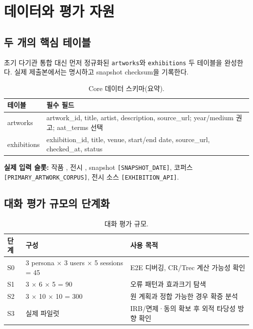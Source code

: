 \documentclass[10pt,a4paper,twocolumn]{article}
\newcommand{\CorpusName}{\texttt{[PRIMARY\_ARTWORK\_CORPUS]}}
\newcommand{\ExhibitionSource}{\texttt{[EXHIBITION\_API]}}
\newcommand{\ArtworkN}{\texttt{[N\_ARTWORKS]}}
\newcommand{\ExhibitionN}{\texttt{[N\_EXHIBITIONS]}}
\newcommand{\SnapshotDate}{\texttt{[SNAPSHOT\_DATE]}}
\begin{document}
\section{데이터와 평가 자원}
\subsection{두 개의 핵심 테이블}
초기 다기관 통합 대신 먼저 정규화된 \texttt{artworks}와 \texttt{exhibitions} 두 테이블을 완성한다. 실제 제출본에서는   명시하고 snapshot checksum을 기록한다.

\begin{table}[H]
\centering
\caption{Core 데이터 스키마(요약).}
\small
\begin{tabularx}{\columnwidth}{@{}p{}X@{}}
\toprule
테이블 & 필수 필드 \\
\midrule
artworks & artwork\_id, title, artist, description, source\_url; year/medium 권고; aat\_terms 선택 \\
exhibitions & exhibition\_id, title, venue, start/end date, source\_url, checked\_at, status \\
\bottomrule
\end{tabularx}
\end{table}

\noindent\textbf{실제 입력 슬롯:} 작품 , 전시 , snapshot \SnapshotDate, 코퍼스 \CorpusName, 전시 소스 \ExhibitionSource.

\subsection{대화 평가 규모의 단계화}
\begin{table}[H]
\centering
\caption{대화 평가 규모.}
\small
\begin{tabularx}{\columnwidth}{@{}p{}p{}X@{}}
\toprule
단계 & 구성 & 사용 목적 \\
\midrule
S0 & 3 persona $\times$ 3 users $\times$ 5 sessions = 45 & E2E 디버깅, CR/Trec 계산 가능성 확인 \\
S1 & 3 $\times$ 6 $\times$ 5 = 90 & 오류 패턴과 효과크기 탐색 \\
S2 & 3 $\times$ 10 $\times$ 10 = 300 & 원 계획과 정합 가능한 경우 확증 분석 \\
S3 & 실제 파일럿 & IRB/면제·동의 확보 후 외적 타당성 방향 확인 \\
\bottomrule
\end{tabularx}
\end{table}
\end{document}

